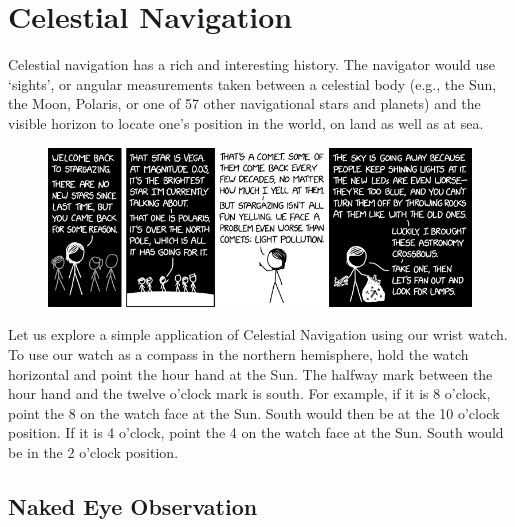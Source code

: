 \documentclass[a4paper,12pt]{extarticle}
\begin{document}
\clearpage
\section{Celestial Navigation}
Celestial navigation has a rich and interesting history. The navigator would use ‘sights’, or angular measurements taken between a celestial body (e.g., the Sun, the Moon, Polaris, or one of 57 other navigational stars and planets) and the visible horizon to locate one’s position in the world, on land
as well as at sea.

\begin{figure}[H]
	\centering
	\includegraphics[width=0.9\linewidth]{navigation.png}
\end{figure}

 Let us explore a simple application of Celestial Navigation using our wrist watch. To use our watch as a compass in the northern hemisphere, hold the watch horizontal and point the hour hand at the Sun. The halfway mark between the hour hand and the twelve o’clock mark is south. For example, if it is 8 o’clock, point the 8 on the watch face at the Sun. South would then be at the 10 o’clock position. If it is 4 o’clock, point the 4 on the watch face at the Sun. South would be in the 2 o’clock position.

\subsection{Naked Eye Observation}
\end{document}
